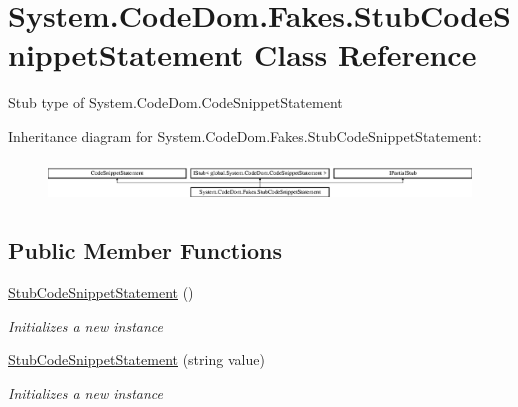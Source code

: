 \hypertarget{class_system_1_1_code_dom_1_1_fakes_1_1_stub_code_snippet_statement}{\section{System.\-Code\-Dom.\-Fakes.\-Stub\-Code\-Snippet\-Statement Class Reference}
\label{class_system_1_1_code_dom_1_1_fakes_1_1_stub_code_snippet_statement}
}


Stub type of System.\-Code\-Dom.\-Code\-Snippet\-Statement 


Inheritance diagram for System.\-Code\-Dom.\-Fakes.\-Stub\-Code\-Snippet\-Statement\-:\begin{figure}[H]
\begin{center}
\leavevmode
\includegraphics[height=1.101278cm]{class_system_1_1_code_dom_1_1_fakes_1_1_stub_code_snippet_statement}
\end{center}
\end{figure}
\subsection*{Public Member Functions}
\begin{DoxyCompactItemize}
\item 
\hyperlink{class_system_1_1_code_dom_1_1_fakes_1_1_stub_code_snippet_statement_a84cf8d29c3163a1cd3d43d4db2a9eee8}{Stub\-Code\-Snippet\-Statement} ()
\begin{DoxyCompactList}\small\item\em Initializes a new instance\end{DoxyCompactList}\item 
\hyperlink{class_system_1_1_code_dom_1_1_fakes_1_1_stub_code_snippet_statement_a664fa6bc3614069a4e92253762c5bc3b}{Stub\-Code\-Snippet\-Statement} (string value)
\begin{DoxyCompactList}\small\item\em Initializes a new instance\end{DoxyCompactList}\end{DoxyCompactItemize}
